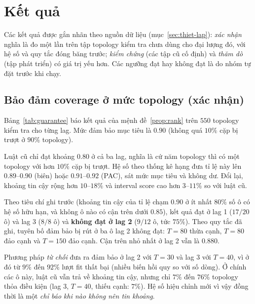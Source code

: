 \section{Kết quả}\label{sec:ket-qua}

Các kết quả được gắn nhãn theo nguồn dữ liệu (mục~\ref{sec:thiet-lap}): \emph{xác nhận} nghĩa là đo một lần trên tập topology kiểm tra chưa dùng cho đại lượng đó, với hệ số và quy tắc đóng băng trước; \emph{kiểm chứng} (các tập cũ cố định) và \emph{thăm dò} (tập phát triển) có giá trị yếu hơn. Các ngưỡng đạt hay không đạt là do nhóm tự đặt trước khi chạy.

\subsection{Bảo đảm coverage ở mức topology (xác nhận)}\label{sec:kq-baodam}
Bảng~\ref{tab:guarantee} báo kết quả của mệnh đề~\ref{prop:rank} trên $550$ topology kiểm tra cho từng lag. Mức đảm bảo mục tiêu là $0.90$ (không quá $10\%$ cặp bị trượt ở $90\%$ topology).

\begin{table}[H]
\centering\footnotesize
\setlength{\tabcolsep}{3pt}

\caption{Tỉ lệ topology thỏa điều kiện trên tập kiểm tra, trung bình trên các ô có hệ số hữu hạn. ``Luật cũ'' là phân vị gộp mức cặp tính lại trên cùng tập hiệu chỉnh. Cột ``Ô đạt $0.90$'' đếm số ô mà cận trên của khoảng tin cậy nhị thức chính xác $95\%$ đạt $0.90$.}\label{tab:guarantee}
\end{table}

Luật cũ chỉ đạt khoảng $0.80$ ở cả ba lag, nghĩa là cứ năm topology thì có một topology với hơn $10\%$ cặp bị trượt. Hệ số theo thống kê hạng đưa tỉ lệ này lên $0.89$--$0.90$ (biên) hoặc $0.91$--$0.92$ (PAC), sát mức mục tiêu và không dư. Đổi lại, khoảng tin cậy rộng hơn $10$--$18\%$ và interval score cao hơn $3$--$11\%$ so với luật cũ.

Theo tiêu chí ghi trước (khoảng tin cậy của tỉ lệ chạm $0.90$ ở ít nhất $80\%$ số ô có hệ số hữu hạn, và không ô nào có cận trên dưới $0.85$), kết quả đạt ở lag 1 ($17/20$ ô) và lag 3 ($8/8$ ô) và \textbf{không đạt ở lag 2} ($9/12$ ô, tức $75\%$). Theo quy tắc đã ghi, tuyên bố đảm bảo bị rút ở ba ô lag 2 không đạt: $T=80$ thừa cạnh, $T=80$ đảo cạnh và $T=150$ đảo cạnh. Cận trên nhỏ nhất ở lag 2 vẫn là $0.880$.

Phương pháp \emph{từ chối} đưa ra đảm bảo ở lag 2 với $T=30$ và lag 3 với $T=40$, vì ở đó từ $9\%$ đến $92\%$ lượt fit thất bại (nhiều biến hồi quy so với số dòng). Ở chính các ô này, luật cũ vẫn trả về khoảng tin cậy, nhưng chỉ $7\%$ đến $76\%$ topology thỏa điều kiện (lag 3, $T=40$, thiếu cạnh: $7\%$). Hệ số hiệu chỉnh mới vì vậy đồng thời là một \emph{chỉ báo khi nào không nên tin khoảng}.

